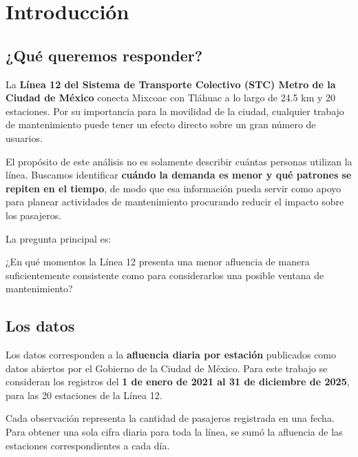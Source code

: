 \documentclass[
  12pt,
  titlepage]{article}
\title{\titulo}
\author{}
\date{\vspace{-2.5em}2026-10-11}
\begin{document}
\maketitle

\section{Introducción}\label{introducciuxf3n}

\subsection{¿Qué queremos responder?}\label{quuxe9-queremos-responder}

La \textbf{Línea 12 del Sistema de Transporte Colectivo (STC) Metro de la Ciudad de México} conecta Mixcoac con Tláhuac a lo largo de 24.5 km y 20 estaciones. Por su importancia para la movilidad de la ciudad, cualquier trabajo de mantenimiento puede tener un efecto directo sobre un gran número de usuarios.

El propósito de este análisis no es solamente describir cuántas personas utilizan la línea. Buscamos identificar \textbf{cuándo la demanda es menor y qué patrones se repiten en el tiempo}, de modo que esa información pueda servir como apoyo para planear actividades de mantenimiento procurando reducir el impacto sobre los pasajeros.

La pregunta principal es:

\begin{citadestacada}
¿En qué momentos la Línea 12 presenta una menor afluencia de manera suficientemente consistente como para considerarlos una posible ventana de mantenimiento?
\end{citadestacada}

\subsection{Los datos}\label{los-datos}

Los datos corresponden a la \textbf{afluencia diaria por estación} publicados como datos abiertos por el Gobierno de la Ciudad de México. Para este trabajo se consideran los registros del \textbf{1 de enero de 2021 al 31 de diciembre de 2025}, para las 20 estaciones de la Línea 12.

Cada observación representa la cantidad de pasajeros registrada en una fecha. Para obtener una sola cifra diaria para toda la línea, se sumó la afluencia de las estaciones correspondientes a cada día.
\end{document}
